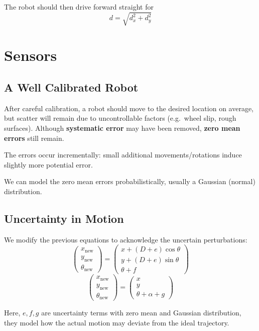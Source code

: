 \documentclass[11pt]{article}
\begin{document}
The robot should then drive forward straight for
\[
  d = \sqrt{d_x^2 + d_y^2}
\]

\section{Sensors}
\subsection{A Well Calibrated Robot}
After careful calibration, a robot should move to the desired location on average, but scatter will remain due to uncontrollable factors (e.g.\ wheel slip, rough surfaces).
Although \textbf{systematic error} may have been removed, \textbf{zero mean errors} still remain.

The errors occur incrementally: small additional movements/rotations induce slightly more potential error.

We can model the zero mean errors probabilistically, usually a Gaussian (normal) distribution.

\subsection{Uncertainty in Motion}
We modify the previous equations to acknowledge the uncertain perturbations:
\[
  \begin{pmatrix}
    x_{\text{new}} \\
    y_{\text{new}} \\
    \theta_{\text{new}} 
  \end{pmatrix}
  =
  \begin{pmatrix}
    x + (D + e)\cos\theta \\
    y + (D + e)\sin\theta \\
    \theta + f
  \end{pmatrix}
\]
\[
  \begin{pmatrix}
    x_{\text{new}} \\
    y_{\text{new}} \\
    \theta_{\text{new}} 
  \end{pmatrix}
  =
  \begin{pmatrix}
    x \\
    y \\
    \theta + \alpha + g
  \end{pmatrix}
\]

Here, $e, f, g$ are uncertainty terms with zero mean and Gaussian distribution, they model how the actual motion may deviate from the ideal trajectory.
\end{document}
